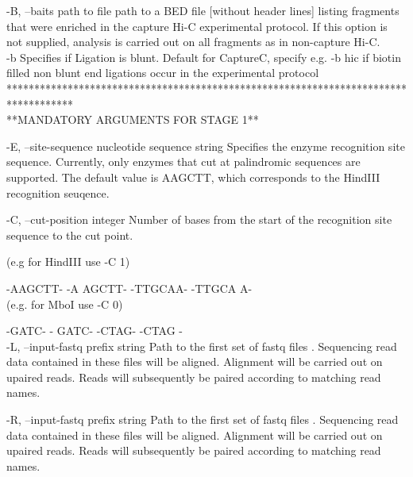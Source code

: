 \documentclass[10pt,a4paper]{article}
\begin{document}
        -B, --baits path to file path to a BED file [without header lines] listing fragments that were enriched in the capture Hi-C experimental protocol.  If this option is not supplied, analysis is carried out on all fragments as in non-capture Hi-C. \\

        -b Specifies if Ligation is blunt. Default for CaptureC, specify e.g. -b hic if biotin filled non blunt end ligations occur in the experimental protocol
************************************************************************************ \\
**MANDATORY ARGUMENTS FOR STAGE 1**
 
        -E, --site-sequence nucleotide sequence string    Specifies the enzyme recognition site sequence.  Currently, only enzymes that cut at palindromic sequences are supported.
                                                            The default value is AAGCTT, which corresponds to the HindIII recognition seuqence.

        -C, --cut-position integer    Number of bases from the start of the recognition site sequence to the cut point.
                                                      
                                                     
 (e.g for HindIII use -C 1)

                     -AAGCTT-    -A       AGCTT-
                     -TTGCAA-    -TTGCA       A- \\
                                                      
                                                      
  (e.g. for MboI use -C 0)

                                                    
                      -GATC-      -       GATC-
                      -CTAG-      -CTAG       -  \\

        -L, --input-fastq prefix string    Path to the first set of fastq files . Sequencing read data contained in these files will be aligned.  Alignment will be carried out on upaired reads.  
                                           Reads will subsequently be paired according to matching read names.

        -R, --input-fastq prefix string    Path to the first set of fastq files . Sequencing read data contained in these files will be aligned.  Alignment will be carried out on upaired reads.  
                                           Reads will subsequently be paired according to matching read names.
\end{document}
